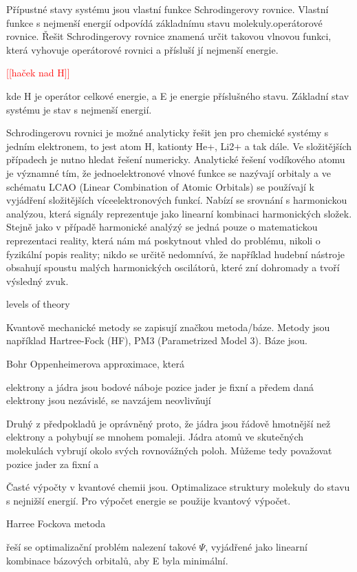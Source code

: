 \documentclass[
  color, %
  table, %
  lof,   %
  lot,   %
]{fithesis3}
\newcommand\fixme[1]{\textcolor{red}{[[#1]]}}
\begin{document}
Přípustné stavy systému jsou vlastní funkce Schrodingerovy rovnice. Vlastní funkce s nejmenší energií odpovídá základnímu stavu molekuly.\Psi operátorové rovnice. Řešit Schrodingerovy rovnice znamená určit takovou vlnovou funkci, která vyhovuje operátorové rovnici a přísluší jí nejmenší energie.

 \fixme{haček nad H}

kde H je operátor celkové energie, a E je energie příslušného stavu. Základní stav systému je stav s nejmenší energií.

Schrodingerovu rovnici je možné analyticky řešit jen pro chemické systémy s jedním elektronem, to jest atom H, kationty He+, Li2+ a tak dále. Ve složitějších případech je nutno hledat řešení numericky. Analytické řešení vodíkového atomu je významné tím, že jednoelektronové vlnové funkce se nazývají orbitaly a ve schématu LCAO (Linear Combination of Atomic Orbitals) se používají k vyjádření složitějších víceelektronových funkcí. Nabízí se srovnání s harmonickou analýzou, která signály reprezentuje jako linearní kombinaci harmonických složek. Stejně jako v případě harmonické analýzý se jedná pouze o matematickou reprezentaci reality, která nám má poskytnout vhled do problému, nikoli o fyzikální popis reality; nikdo se určitě nedomnívá, že například hudební nástroje obsahují spoustu malých harmonických oscilátorů, které zní dohromady a tvoří výsledný zvuk.

levels of theory

Kvantově mechanické metody se zapisují značkou metoda/báze. Metody jsou například Hartree-Fock (HF), PM3 (Parametrized Model 3). Báze jsou.

Bohr Oppenheimerova approximace, která

elektrony a jádra jsou bodové náboje
pozice jader je fixní a předem daná
elektrony jsou nezávislé, se navzájem neovlivňují

Druhý z předpokladů je oprávněný proto, že jádra jsou řádově hmotnější než elektrony a pohybují se mnohem pomaleji. Jádra atomů ve skutečných molekulách vybrují okolo svých rovnovážných poloh. Můžeme tedy považovat pozice jader za fixní a 

Časté výpočty v kvantové chemii jsou. Optimalizace struktury molekuly do stavu s nejnižší energií. Pro výpočet energie se použije kvantový výpočet.

Harree Fockova metoda

řeší se optimalizační problém nalezení takové \(\Psi\), vyjádřené jako linearní kombinace bázových orbitalů, aby E byla minimální.
\end{document}
